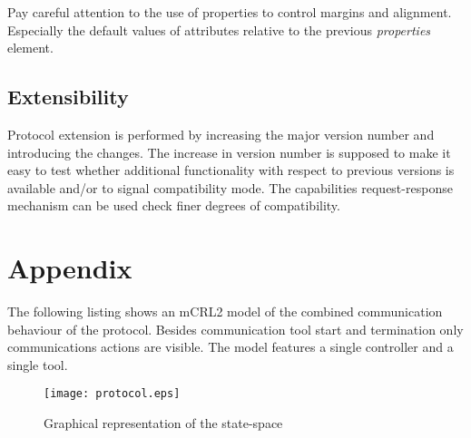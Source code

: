 \documentclass{article}
\begin{document}
  \noindent Pay careful attention to the use of properties to control margins and
  alignment. Especially the default values of attributes relative to the
  previous \textit{properties} element.

  \subsection{Extensibility}

   Protocol extension is performed by increasing the major version number and
   introducing the changes. The increase in version number is supposed to make
   it easy to test whether additional functionality with respect to previous
   versions is available and/or to signal compatibility mode. The capabilities
   request-response mechanism can be used check finer degrees of compatibility.
   
  \enlargethispage*{4pt}
  

  \section{Appendix}
  \pagestyle{empty}

  The following listing shows an mCRL2 model of the combined communication
  behaviour of the protocol. Besides communication tool start and termination
  only communications actions are visible. The model features a single
  controller and a single tool.

  \addtolength{\oddsidemargin}{-2cm}
  \addtolength{\evensidemargin}{-2cm}
  \addtolength{\textwidth}{4cm}
  \small  \normalsize

  \pagebreak
  \addtolength{\oddsidemargin}{2cm}
  \addtolength{\evensidemargin}{2cm}

  \begin{figure}[H]
   \texttt{[image: protocol.eps]}
   \caption{Graphical representation of the state-space}
  \end{figure}


   
\end{document}
